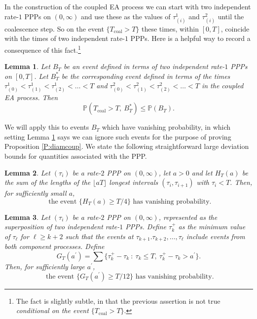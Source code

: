 \documentclass[12pt]{article}
\newtheorem{Lemma}{Lemma}
\renewcommand{\Pr}{{\mathbb P}}
\newcommand{\Tcouple}{T_{\mathrm{coal}}}
\begin{document}
In the construction of the coupled EA process we can start with two independent rate-$1$ PPPs on $(0,\infty)$ and use these as the values of 
$\tau^1_{(i)}$ and $\tau^2_{(i)}$ until the coalescence step.  
So on the event $\{\Tcouple > T\}$ these times, within $[0,T]$,  coincide with the times of  two independent rate-$1$ PPPs.
Here is a helpful way to record a consequence of this fact.\footnote{The fact is slightly subtle, in that the previous assertion is not true
{\em conditional on the event $\{\Tcouple > T\}$}.}
\begin{Lemma}
\label{L:indePoi}
Let $B_T$ be an event defined in terms of two independent rate-$1$ PPPs 
on $[0,T]$.
Let $B^*_T$ be the corresponding event 
defined in terms of the times 
$ \tau^1_{(0)} < \tau^1_{(1)} <  \tau^1_{(2)} < \ldots < T$ 
and
$ \tau^2_{(0)} < \tau^2_{(1)} <  \tau^2_{(2)} < \ldots < T$ 
in the coupled EA process.  Then
\[ \Pr( \Tcouple > T, \ B^*_T)  \le \Pr(B_T)  . \]
\end{Lemma}
We will apply this to events $B_T$ which have vanishing probability, in which setting Lemma \ref{L:indePoi} 
says we can ignore such events for the purpose of proving Proposition \ref{P:diamcoup}.
We state the following  straightforward 
large deviation bounds for quantities associated with the PPP.
\begin{Lemma}
\label{L:rate2}
Let $(\tau_i)$ be a rate-$2$ PPP on $(0,\infty)$, let 
$a > 0$ and let $H_T(a)$ be the sum of the lengths of the 
$\lfloor aT \rfloor$ longest intervals $(\tau_i, \tau_{i+1})$ with $\tau_i < T$.
Then, for sufficiently small $a$, 
\begin{equation}
 \mbox{ the event }
 \{ H_T(a) \ge T/4 \}
 \mbox{ has vanishing probability}. 
\label{HbT}
\end{equation}
\end{Lemma}
\begin{Lemma}
\label{L:rate3}
Let $(\tau_i)$ be a rate-$2$ PPP on $(0,\infty)$, represented as the superposition of two independent rate-$1$ PPPs.
Define $\tau_k^+$ as the minimum value of $\tau_\ell$ for $\ell \ge k+2$ such that the events at $\tau_{k+1}. \tau_{k+2}, \ldots, \tau_{\ell}$ include events 
from both component processes.  Define
\[ G_T(a^\prime) = \sum \{  \tau_k^+ - \tau_k \ : \  \tau_k \le T, \ \tau_k^+ - \tau_k > a^\prime \} . \]
Then, for sufficiently large $a^\prime$, 
\begin{equation}
 \mbox{ the event }
 \{ G_T(a^\prime) \ge T/12 \}
  \mbox{ has vanishing probability}.
\label{HbT2}
\end{equation}
\end{Lemma}
\end{document}
